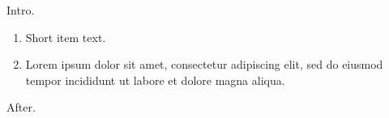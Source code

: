 \documentclass[11pt]{article}
\begin{document}
Intro.
\begin{enumerate}[label=\Roman*.,leftmargin=*]
\item Short item text.
\item Lorem ipsum dolor sit amet, consectetur adipiscing elit, sed do eiusmod tempor incididunt ut labore et dolore magna aliqua.
\end{enumerate}
After.
\end{document}

